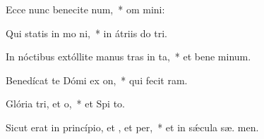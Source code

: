 \item Ecce nunc benecite num,~* om  mini:
\item Qui statis in mo ni,~* in átriis do  tri.
\item In nóctibus extóllite manus tras in ta,~* et bene minum.
\item Benedícat te Dómi ex on,~* qui fecit   ram.
\item Glória tri, et o,~* et Spi to.
\item Sicut erat in princípio, et , et per,~* et in sǽcula sæ. men.

